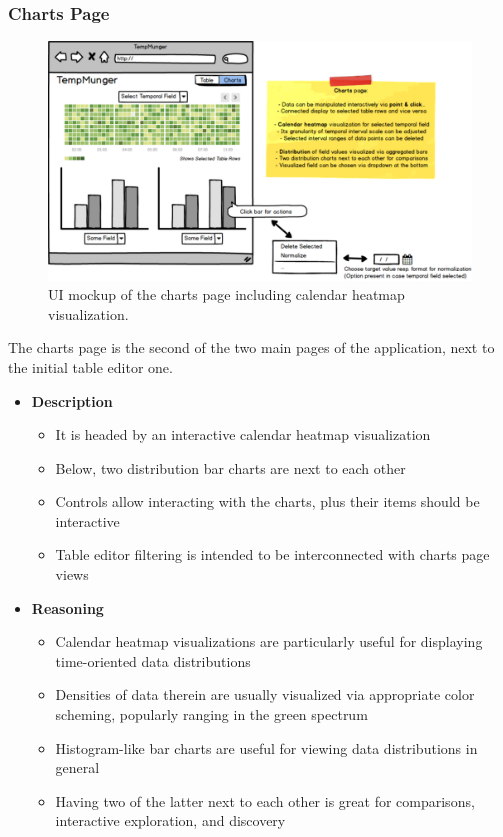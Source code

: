 \subsubsection{Charts Page}

\begin{figure}[h]
  \centering
  \includegraphics[width=1.1\textwidth]{figures/design/mockup-6}
  \caption{UI mockup of the charts page including calendar heatmap visualization.}
  \label{fig:mockup-6}
\end{figure}

The charts page is the second of the two main pages of the application, next to the initial table editor one.

\begin{itemize}
  \item \textbf{Description}
  \begin{itemize}
    \item It is headed by an interactive calendar heatmap visualization
    \item Below, two distribution bar charts are next to each other
    \item Controls allow interacting with the charts, plus their items should be interactive
    \item Table editor filtering is intended to be interconnected with charts page views
  \end{itemize}
  \item \textbf{Reasoning}
  \begin{itemize}
    \item Calendar heatmap visualizations are particularly useful for displaying time-oriented data distributions
    \item Densities of data therein are usually visualized via appropriate color scheming, popularly ranging in the green spectrum
    \item Histogram-like bar charts are useful for viewing data distributions in general
    \item Having two of the latter next to each other is great for comparisons, interactive exploration, and discovery
  \end{itemize}
\end{itemize}


